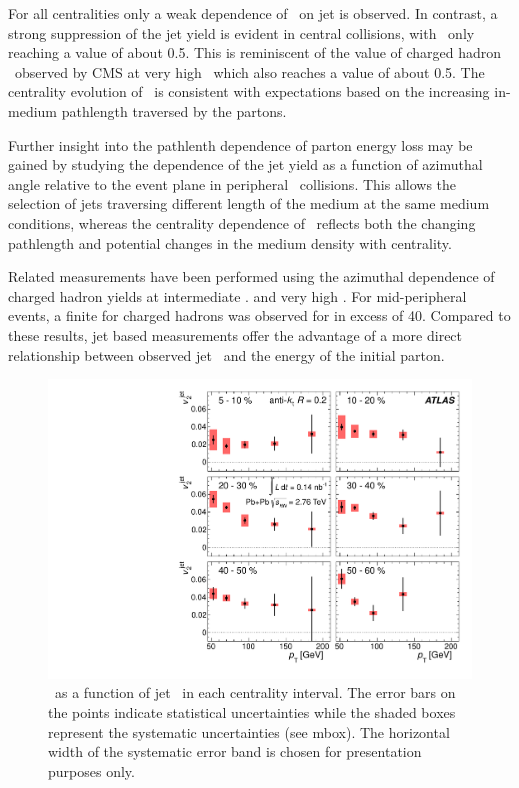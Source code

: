 For all centralities only a weak dependence of \Rcp\ on jet \pt is observed. 
In contrast, a strong suppression of the jet yield is evident in
central collisions, with \Rcp\ only reaching a value of about 0.5. 
This is reminiscent of the value of charged hadron \Raa\ observed 
by CMS at very high \pt\, which also reaches a value of about 0.5.
The centrality evolution of \Rcp\ is consistent with expectations
based on the increasing in-medium pathlength traversed by the partons.

Further insight into the pathlenth dependence of parton energy 
loss may be gained by studying the dependence of the jet yield
as a function of azimuthal angle relative to the event plane
in peripheral \PbPb\ collisions. This allows the selection of jets 
traversing different length of the medium at the same medium 
conditions, whereas the centrality dependence of \Rcp\ reflects 
both the changing pathlength and potential changes in the medium
density with centrality.

Related measurements have been performed using the azimuthal dependence 
of charged hadron yields at intermediate \pt 
\cite{Adams:2004wz,Adler:2006bw,Adare:2010sp, ATLAS:2011ah, Abelev:2012di}. 
and very high \pt \cite{Chatrchyan:2012xq}. For mid-peripheral events,
a finite \vtwo for charged hadrons was observed for \pt in excess of 40\GeVc.
Compared to these results, jet based measurements offer the advantage
of a more direct relationship between observed jet \pt\ and the energy
of the initial parton.

\begin{figure}[!h]
\begin{center}
\includegraphics[width=0.49\mboxwidth]{jetfigures/ATLAS_jetv2.pdf}
\caption{\vtjet\ as a function of jet \pTjet\ in each centrality
   interval. The error bars on the points indicate statistical
   uncertainties while the shaded boxes represent the systematic
   uncertainties (see mbox). The horizontal width of the systematic
   error band is chosen for presentation purposes only. }
\label{fig:GR:ATLAS_jet_v2}
\end{center}
\end{figure}

